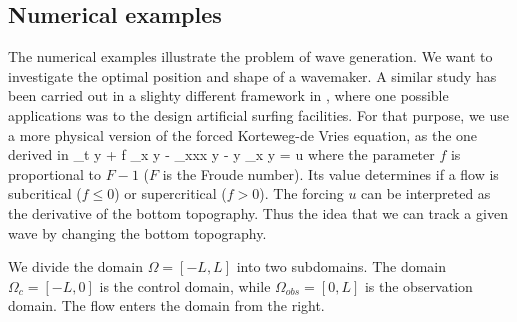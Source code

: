 \subsection{Numerical examples}
The numerical examples illustrate the problem of wave generation. We want to investigate the optimal position and shape of a wavemaker. A similar study has been carried out in a slighty different framework in \cite{nersisyan2014generation}, where one possible applications was to
the design artificial surfing facilities. For that purpose, we use a more physical version of the forced Korteweg-de Vries equation, as the one derived in \cite{milewski2004forced}
\be
\partial_t y + f \partial_x y - \partial_{xxx} y - y \partial_x y = u
\label{PhysicalKDV}
\ee
where the parameter $f$ is proportional to $F-1$ ($F$ is the Froude number). Its value determines if a flow is subcritical ($f\leq 0$) or supercritical ($f> 0 $). The forcing $u$ can be interpreted as the derivative of the bottom topography. Thus the idea that we can track a given wave by changing the bottom topography.

We divide the domain $\Omega = [-L,L]$ into two subdomains. The domain $\Omega_c = [-L,0]$ is the control domain, while $\Omega_{obs} = [0,L]$ is the observation domain. The flow enters the domain from the right.



